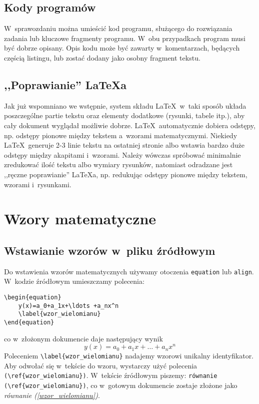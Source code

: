 \section{Kody programów}
W~sprawozdaniu można umieścić kod programu, służącego do rozwiązania zadania lub kluczowe fragmenty programu. W~obu przypadkach program musi być dobrze opisany. Opis kodu może być zawarty w~komentarzach, będących częścią listingu, lub zostać dodany jako osobny fragment tekstu.

\section{,,Poprawianie'' \LaTeX a}
Jak już wspomniano we wstępnie, system składu \LaTeX \ w~taki sposób układa poszczególne partie tekstu oraz elementy dodatkowe (rysunki, tabele itp.), aby cały dokument wyglądał możliwie dobrze. \LaTeX \ automatycznie dobiera odstępy, np. odstępy pionowe między tekstem a~wzorami matematycznymi. Niekiedy \LaTeX \ generuje 2-3 linie tekstu na ostatniej stronie albo wstawia bardzo duże odstępy między akapitami i~wzorami. Należy wówczas spróbować minimalnie zredukować ilość tekstu albo wymiary rysunków, natomiast odradzane jest ,,ręczne poprawianie'' \LaTeX a, np. redukując odstępy pionowe między tekstem, wzorami i~rysunkami.

\chapter{Wzory matematyczne}
\section{Wstawianie wzorów w~pliku źródłowym}
Do wstawienia wzorów matematycznych używamy otoczenia \verb|equation| lub \verb|align|. W~kodzie źródłowym umieszczamy polecenia:
\begin{lstlisting}[style=customlatex,frame=single]
\begin{equation}
	y(x)=a_0+a_1x+\ldots +a_nx^n
	\label{wzor_wielomianu}
\end{equation}
\end{lstlisting}
co w~złożonym dokumencie daje następujący wynik
\begin{equation}
y(x)=a_0+a_1x+\ldots +a_nx^n
\label{wzor_wielomianu}
\end{equation}
Poleceniem \verb|\label{wzor_wielomianu}| nadajemy wzorowi unikalny identyfikator. Aby odwołać się w~tekście do wzoru, wystarczy użyć polecenia \verb|(\ref{wzor_wielomianu})|. W~tekście źródłowym piszemy: \verb|równanie (\ref{wzor_wielomianu})|, co w~gotowym dokumencie zostaje złożone jako \emph{równanie (\ref{wzor_wielomianu})}.

